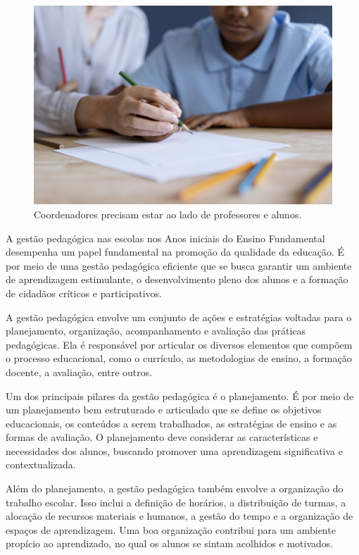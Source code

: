 \begin{figure}
\centering
\includegraphics[width=\textwidth]{./imgs/Imagem004.jpg}
\caption{Coordenadores precisam estar ao lado de professores e alunos.}
\end{figure}

A gestão pedagógica nas escolas nos Anos iniciais do Ensino Fundamental
desempenha um papel fundamental na promoção da qualidade da educação. É
por meio de uma gestão pedagógica eficiente que se busca garantir um
ambiente de aprendizagem estimulante, o desenvolvimento pleno dos alunos
e a formação de cidadãos críticos e participativos.

A gestão pedagógica envolve um conjunto de ações e estratégias voltadas
para o planejamento, organização, acompanhamento e avaliação das
práticas pedagógicas. Ela é responsável por articular os diversos
elementos que compõem o processo educacional, como o currículo, as
metodologias de ensino, a formação docente, a avaliação, entre outros.

Um dos principais pilares da gestão pedagógica é o planejamento. É por
meio de um planejamento bem estruturado e articulado que se define os
objetivos educacionais, os conteúdos a serem trabalhados, as estratégias
de ensino e as formas de avaliação. O planejamento deve considerar as
características e necessidades dos alunos, buscando promover uma
aprendizagem significativa e contextualizada.

Além do planejamento, a gestão pedagógica também envolve a organização
do trabalho escolar. Isso inclui a definição de horários, a distribuição
de turmas, a alocação de recursos materiais e humanos, a gestão do tempo
e a organização de espaços de aprendizagem. Uma boa organização
contribui para um ambiente propício ao aprendizado, no qual os alunos se
sintam acolhidos e motivados.

